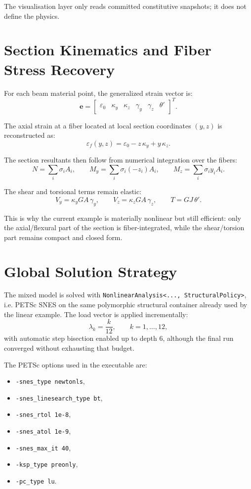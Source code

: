 The visualisation layer only reads committed constitutive snapshots; it does
not define the physics.

\section{Section Kinematics and Fiber Stress Recovery}

For each beam material point, the generalized strain vector is:
\[
\mathbf{e} =
\begin{bmatrix}
\varepsilon_0 &
\kappa_y &
\kappa_z &
\gamma_y &
\gamma_z &
\theta'
\end{bmatrix}^{T}.
\]

The axial strain at a fiber located at local section coordinates \((y,z)\) is
reconstructed as:
\[
\varepsilon_f(y,z) = \varepsilon_0 - z\,\kappa_y + y\,\kappa_z.
\]

The section resultants then follow from numerical integration over the fibers:
\[
N   = \sum_i \sigma_i A_i,
\qquad
M_y = \sum_i \sigma_i(-z_i)A_i,
\qquad
M_z = \sum_i \sigma_i y_i A_i.
\]

The shear and torsional terms remain elastic:
\[
V_y = \kappa_y G A\,\gamma_y,
\qquad
V_z = \kappa_z G A\,\gamma_z,
\qquad
T   = GJ\,\theta'.
\]

This is why the current example is materially nonlinear but still efficient:
only the axial/flexural part of the section is fiber-integrated, while the
shear/torsion part remains compact and closed form.

\section{Global Solution Strategy}

The mixed model is solved with
\texttt{NonlinearAnalysis<..., StructuralPolicy>}, i.e. PETSc SNES on the same
polymorphic structural container already used by the linear example.  The load
vector is applied incrementally:
\[
\lambda_k = \frac{k}{12},
\qquad
k = 1,\dots,12,
\]
with automatic step bisection enabled up to depth \(6\), although the final
run converged without exhausting that budget.

The PETSc options used in the executable are:
\begin{itemize}
  \item \texttt{-snes\_type newtonls},
  \item \texttt{-snes\_linesearch\_type bt},
  \item \texttt{-snes\_rtol 1e-8},
  \item \texttt{-snes\_atol 1e-9},
  \item \texttt{-snes\_max\_it 40},
  \item \texttt{-ksp\_type preonly},
  \item \texttt{-pc\_type lu}.
\end{itemize}


